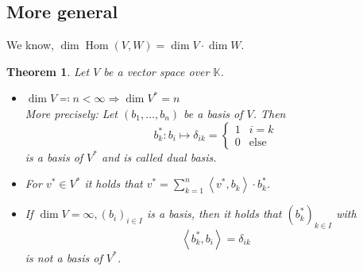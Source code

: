 \documentclass[a4paper,landscape,twocolumn]{article}
\newcommand\functional[1]{\left\langle{#1}\right\rangle}
\newtheorem{theorem}{Theorem}
\DeclareMathOperator\Hom{Hom} %
\begin{document}
\subsection{More general}
%
%
We know, $\dim{\Hom(V,W)} = \dim{V} \cdot \dim{W}$.
\begin{theorem}
  \label{5.26}
  Let $V$ be a vector space over $\mathbb K$.
  \begin{itemize}
    \item $\dim{V} \eqqcolon n < \infty \Rightarrow \dim{V^*} = n$ \\
      More precisely: Let $(b_1, \ldots, b_n)$ be a basis of $V$.
      Then \[
        b_k^*: b_i \mapsto \delta_{ik} = \begin{cases} 1 & i = k \\ 0 & \text{else} \end{cases}
      \]
      is a basis of $V^*$ and is called \emph{dual basis}.
    \item For $v^* \in V^*$ it holds that $v^* = \sum_{k=1}^n \functional{v^*, b_k} \cdot b_k^*$.
    \item If $\dim{V} = \infty, (b_i)_{i \in I}$ is a basis, then it holds that $(b^*_k)_{k \in I}$ with
      \[ \functional{b_k^*, b_i} = \delta_{ik} \]
      is \emph{not} a basis of $V^*$.
  \end{itemize}
\end{theorem}
\end{document}
